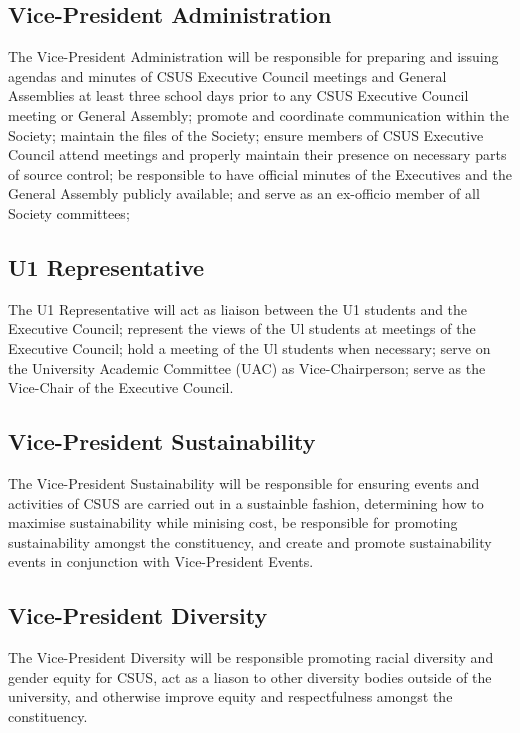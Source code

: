 \subsection{Vice-President
Administration}\label{vice-president-administration}

The Vice-President Administration will be responsible for preparing and
issuing agendas and minutes of CSUS Executive Council meetings and
General Assemblies at least three school days prior to any CSUS
Executive Council meeting or General Assembly; promote and coordinate
communication within the Society; maintain the files of the Society;
ensure members of CSUS Executive Council attend meetings and properly
maintain their presence on necessary parts of source control; be
responsible to have official minutes of the Executives and the General
Assembly publicly available; and serve as an ex-officio member of all
Society committees;

\subsection{U1 Representative}\label{u1-representative}

The U1 Representative will act as liaison between the U1 students and
the Executive Council; represent the views of the Ul students at
meetings of the Executive Council; hold a meeting of the Ul students
when necessary; serve on the University Academic Committee (UAC) as
Vice-Chairperson; serve as the Vice-Chair of the Executive Council.

\subsection{Vice-President
Sustainability}\label{vice-president-sustainability}

The Vice-President Sustainability will be responsible for ensuring
events and activities of CSUS are carried out in a sustainble fashion,
determining how to maximise sustainability while minising cost, be
responsible for promoting sustainability amongst the constituency, and
create and promote sustainability events in conjunction with
Vice-President Events.

\subsection{Vice-President Diversity}\label{vice-president-diversity}

The Vice-President Diversity will be responsible promoting racial
diversity and gender equity for CSUS, act as a liason to other diversity
bodies outside of the university, and otherwise improve equity and
respectfulness amongst the constituency.

